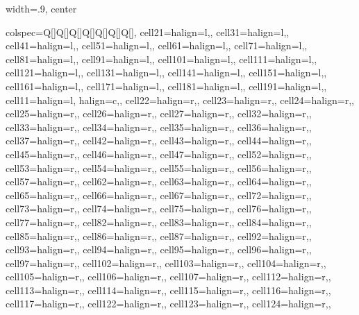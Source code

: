 \begin{table}
  \caption{\label{tbl:mlp_sumstats}Summary statistics for Chinese and Japanese linked in MLP}
  \begin{adjustbox}{width=.9\textwidth, center}
\begin{tblr}[         %
]                     %
{                     %
colspec={Q[]Q[]Q[]Q[]Q[]Q[]Q[]},
cell{2}{1}={}{halign=l,},
cell{3}{1}={}{halign=l,},
cell{4}{1}={}{halign=l,},
cell{5}{1}={}{halign=l,},
cell{6}{1}={}{halign=l,},
cell{7}{1}={}{halign=l,},
cell{8}{1}={}{halign=l,},
cell{9}{1}={}{halign=l,},
cell{10}{1}={}{halign=l,},
cell{11}{1}={}{halign=l,},
cell{12}{1}={}{halign=l,},
cell{13}{1}={}{halign=l,},
cell{14}{1}={}{halign=l,},
cell{15}{1}={}{halign=l,},
cell{16}{1}={}{halign=l,},
cell{17}{1}={}{halign=l,},
cell{18}{1}={}{halign=l,},
cell{19}{1}={}{halign=l,},
cell{1}{1}={}{halign=l, halign=c,},
cell{2}{2}={}{halign=r,},
cell{2}{3}={}{halign=r,},
cell{2}{4}={}{halign=r,},
cell{2}{5}={}{halign=r,},
cell{2}{6}={}{halign=r,},
cell{2}{7}={}{halign=r,},
cell{3}{2}={}{halign=r,},
cell{3}{3}={}{halign=r,},
cell{3}{4}={}{halign=r,},
cell{3}{5}={}{halign=r,},
cell{3}{6}={}{halign=r,},
cell{3}{7}={}{halign=r,},
cell{4}{2}={}{halign=r,},
cell{4}{3}={}{halign=r,},
cell{4}{4}={}{halign=r,},
cell{4}{5}={}{halign=r,},
cell{4}{6}={}{halign=r,},
cell{4}{7}={}{halign=r,},
cell{5}{2}={}{halign=r,},
cell{5}{3}={}{halign=r,},
cell{5}{4}={}{halign=r,},
cell{5}{5}={}{halign=r,},
cell{5}{6}={}{halign=r,},
cell{5}{7}={}{halign=r,},
cell{6}{2}={}{halign=r,},
cell{6}{3}={}{halign=r,},
cell{6}{4}={}{halign=r,},
cell{6}{5}={}{halign=r,},
cell{6}{6}={}{halign=r,},
cell{6}{7}={}{halign=r,},
cell{7}{2}={}{halign=r,},
cell{7}{3}={}{halign=r,},
cell{7}{4}={}{halign=r,},
cell{7}{5}={}{halign=r,},
cell{7}{6}={}{halign=r,},
cell{7}{7}={}{halign=r,},
cell{8}{2}={}{halign=r,},
cell{8}{3}={}{halign=r,},
cell{8}{4}={}{halign=r,},
cell{8}{5}={}{halign=r,},
cell{8}{6}={}{halign=r,},
cell{8}{7}={}{halign=r,},
cell{9}{2}={}{halign=r,},
cell{9}{3}={}{halign=r,},
cell{9}{4}={}{halign=r,},
cell{9}{5}={}{halign=r,},
cell{9}{6}={}{halign=r,},
cell{9}{7}={}{halign=r,},
cell{10}{2}={}{halign=r,},
cell{10}{3}={}{halign=r,},
cell{10}{4}={}{halign=r,},
cell{10}{5}={}{halign=r,},
cell{10}{6}={}{halign=r,},
cell{10}{7}={}{halign=r,},
cell{11}{2}={}{halign=r,},
cell{11}{3}={}{halign=r,},
cell{11}{4}={}{halign=r,},
cell{11}{5}={}{halign=r,},
cell{11}{6}={}{halign=r,},
cell{11}{7}={}{halign=r,},
cell{12}{2}={}{halign=r,},
cell{12}{3}={}{halign=r,},
cell{12}{4}={}{halign=r,},
}
\end{tblr}
\end{adjustbox}
\end{table}
